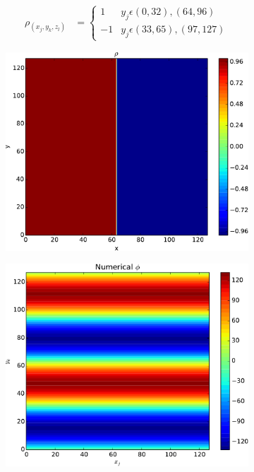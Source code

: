 		\begin{align}
			\rho_(x_j,y_k,z_l) &= \begin{cases} 1  & y_j \epsilon (0, 32), (64,96)\\ -1  & y_j \epsilon (33, 65), (97,127) \end{cases}
		\end{align}

		\begin{figure}
			\centering
				\begin{subfigure}[b]{0.32\textwidth}
					\includegraphics[width = \textwidth]{figures/verification/heaviside/rho.pdf}
				\end{subfigure}
				\begin{subfigure}[b]{0.32\textwidth}
					\includegraphics[width = \textwidth]{figures/verification/heaviside/numerical.pdf}

\end{subfigure}
\end{figure}
